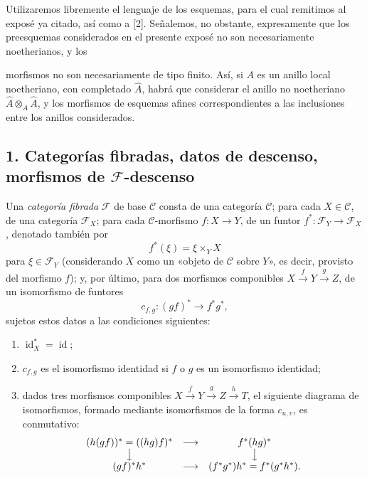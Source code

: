 Utilizaremos libremente el lenguaje de los esquemas, para el cual remitimos al
exposé ya citado, así como a [2]. Señalemos, no obstante, expresamente que los
preesquemas considerados en el presente exposé no son necesariamente
noetherianos, y los

morfismos no son necesariamente de tipo finito. Así, si $A$ es un anillo local
noetheriano, con completado $\widehat A$, habrá que considerar el anillo no
noetheriano $\widehat A\otimes_A\widehat A$, y los morfismos de esquemas afines
correspondientes a las inclusiones entre los anillos considerados.


\subsection*{1. Categorías fibradas, datos de descenso, morfismos de
$\mathcal F$-descenso}

 Una \emph{categoría fibrada} $\mathcal F$ de base
$\mathcal C$ consta de una categoría $\mathcal C$; para cada
$X\in\mathcal C$, de una categoría $\mathcal F_X$; para cada
$\mathcal C$-morfismo $f:X\longrightarrow Y$, de un funtor
$f^*:\mathcal F_Y\longrightarrow\mathcal F_X$, denotado también por
\[
  f^*(\xi)=\xi\times_Y X
\]
para $\xi\in\mathcal F_Y$ (considerando $X$ como un «objeto de
$\mathcal C$ sobre $Y$», es decir, provisto del morfismo $f$); y, por último,
para dos morfismos componibles
$X\xrightarrow{f}Y\xrightarrow{g}Z$, de un isomorfismo de funtores
\[
  c_{f,g}:(gf)^*\longrightarrow f^*g^*,
\]
sujetos estos datos a las condiciones siguientes:

\begin{enumerate}
\item[(i)] $\operatorname{id}_X^*=\operatorname{id}$;
\item[(ii)] $c_{f,g}$ es el isomorfismo identidad si $f$ o $g$ es un
isomorfismo identidad;
\item[(iii)] dados tres morfismos componibles
$X\xrightarrow{f}Y\xrightarrow{g}Z\xrightarrow{h}T$, el siguiente diagrama de
isomorfismos, formado mediante isomorfismos de la forma $c_{u,v}$, es
conmutativo:
\[
\begin{array}{ccc}
  (h(gf))^*=((hg)f)^* & \longrightarrow & f^*(hg)^* \\
  \big\downarrow && \big\downarrow \\
  (gf)^*h^* & \longrightarrow & (f^*g^*)h^*=f^*(g^*h^*).
\end{array}
\]
\end{enumerate}

